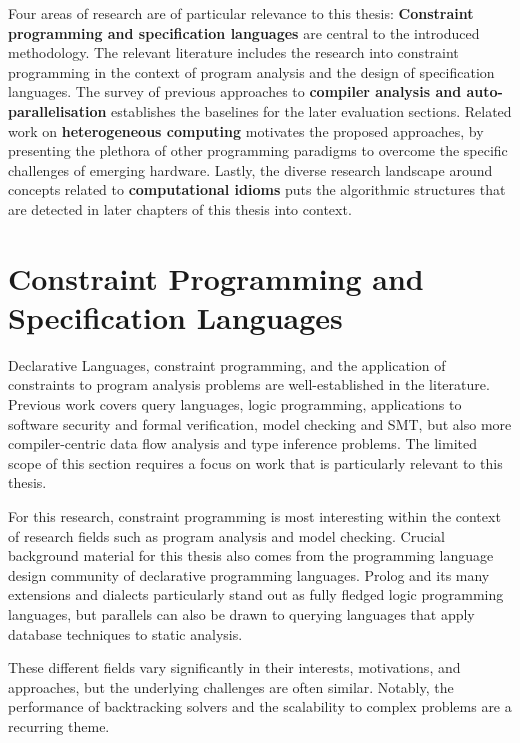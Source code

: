
    Four areas of research are of particular relevance to this thesis:
    {\bf Constraint programming and specification languages} are central to the
    introduced methodology.
    The relevant literature includes the research into constraint programming in
    the context of program analysis and the design of specification languages.
    The survey of previous approaches to
    {\bf compiler analysis and auto-parallelisation}
    establishes the baselines for the later evaluation sections.
    Related work on {\bf heterogeneous computing} motivates the proposed
    approaches, by presenting the plethora of other programming paradigms to
    overcome the specific challenges of emerging hardware.
    Lastly, the diverse research landscape around concepts related to
    {\bf computational idioms} puts the algorithmic structures that are detected
    in later chapters of this thesis into context.

\section{Constraint Programming and Specification Languages}

    Declarative Languages, constraint programming, and the application of
    constraints to program analysis problems are well-established in the
    literature.
    Previous work covers query languages, logic programming, applications to
    software security and formal verification, model checking and SMT,
    but also more compiler-centric data flow analysis and type inference
    problems.
    The limited scope of this section requires a focus on work that is
    particularly relevant to this thesis.

    For this research, constraint programming is most interesting within the
    context of research fields such as program analysis and model checking.
    Crucial background material for this thesis also comes from
    the programming language design community of declarative programming
    languages.
    Prolog and its many extensions and dialects particularly stand out as
    fully fledged logic programming languages, but parallels can also be drawn
    to querying languages that apply database techniques to static analysis.

    These different fields vary significantly in their interests, motivations,
    and approaches, but the underlying challenges are often similar.
    Notably, the performance of backtracking solvers and the scalability to
    complex problems are a recurring theme.


